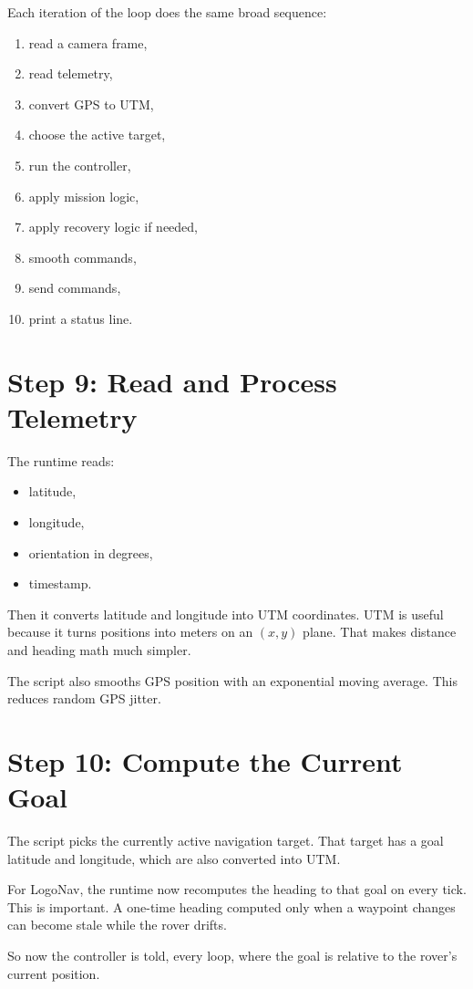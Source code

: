 \documentclass[11pt]{article}
\begin{document}
Each iteration of the loop does the same broad sequence:
\begin{enumerate}[leftmargin=*]
\item read a camera frame,
\item read telemetry,
\item convert GPS to UTM,
\item choose the active target,
\item run the controller,
\item apply mission logic,
\item apply recovery logic if needed,
\item smooth commands,
\item send commands,
\item print a status line.
\end{enumerate}

\section*{Step 9: Read and Process Telemetry}
The runtime reads:
\begin{itemize}[leftmargin=*]
\item latitude,
\item longitude,
\item orientation in degrees,
\item timestamp.
\end{itemize}

Then it converts latitude and longitude into UTM coordinates.
UTM is useful because it turns positions into meters on an \((x, y)\) plane.
That makes distance and heading math much simpler.

The script also smooths GPS position with an exponential moving average.
This reduces random GPS jitter.

\section*{Step 10: Compute the Current Goal}
The script picks the currently active navigation target.
That target has a goal latitude and longitude, which are also converted into UTM.

For LogoNav, the runtime now recomputes the heading to that goal on every tick.
This is important.
A one-time heading computed only when a waypoint changes can become stale while the rover drifts.

So now the controller is told, every loop, where the goal is relative to the rover's current position.
\end{document}
